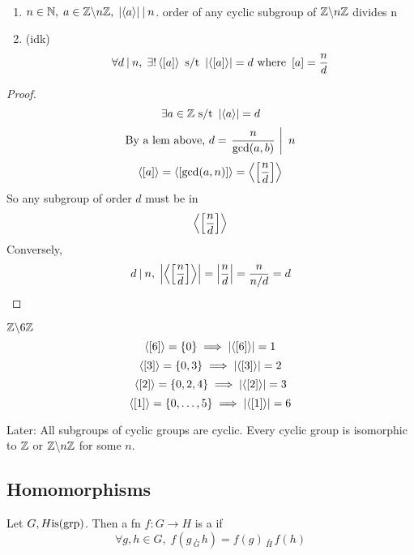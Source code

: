 \documentclass[12pt]{article}
\newcommand{\order}[1]{\left\lvert#1\right\rvert}
\newcommand{\divides}{\mathbin|}
\newcommand{\class}[1]{\left[#1\right]}
\begin{document}
\bboxcoro
\begin{coro}\
    \begin{enumerate}
        \item \(n\in\N,\;a\in\Z\backslash n\Z,\;\order{\gen{a}}\divides n\).
            order of any cyclic subgroup of \(\mathbb Z\backslash n\mathbb Z\) divides n
        \item (idk)
            \[
                \forall d\divides n,\;\exists!\gen{\class{a}}\st
                \order{\gen{\class{a}}}=d\T{ where }
                \class{a}=\frac nd
            \]
    \end{enumerate}
\end{coro}
\ebox

\bboxproof
\begin{proof}
    \[
        \exists a\in\Z\st\order{\gen{a}}=d
    \]
    \[
        \T{By a lem above, }d=\left.\frac n{\gcd(a,b)}\ \right|\ n
    \]
    \[
        \gen{\class{a}}=\gen{\class{\gcd(a,n)}}=\gen{\class{\frac nd}}
    \]
    So any subgroup of order \(d\) must be in
    \[
        \gen{\class{\frac nd}}
    \]
    Conversely,
    \[
        d\divides n,\;\order{\gen{\class{\frac nd}}}=\order{\frac nd}=\frac n{n/d}=d
    \]
\end{proof}
\ebox


\bboxexam
\begin{exam}
    \(\mathbb Z\backslash 6\mathbb Z\)
    \[
        \gen{\class{6}}=\{0\}\implies\order{\gen{\class{6}}}=1
    \]
    \[
        \gen{\class{3}}=\{0,3\}\implies\order{\gen{\class{3}}}=2
    \]
    \[
        \gen{\class{2}}=\{0,2,4\}\implies\order{\gen{\class{2}}}=3
    \]
    \[
        \gen{\class{1}}=\{0,\dots,5\}\implies\order{\gen{\class{1}}}=6
    \]
\end{exam}
\ebox

Later: All subgroups of cyclic groups are cyclic. Every cyclic group is isomorphic
to \(\mathbb Z\) or \(\mathbb Z\backslash n\mathbb Z\) for some \(n\).

\subsection{Homomorphisms}

\bboxdefn
\begin{defn}[Homomorphism]\label{defn:hom}
    Let \(G,H\mathrm{is}(\mathrm{grp})\). Then a fn \(f:G\to H\) is a  if
    \[
        \forall g,h\in G,\;f(g\underset G\cdot h)=f(g)\underset H\cdot f(h)
    \]
\end{defn}
\ebox
\end{document}
